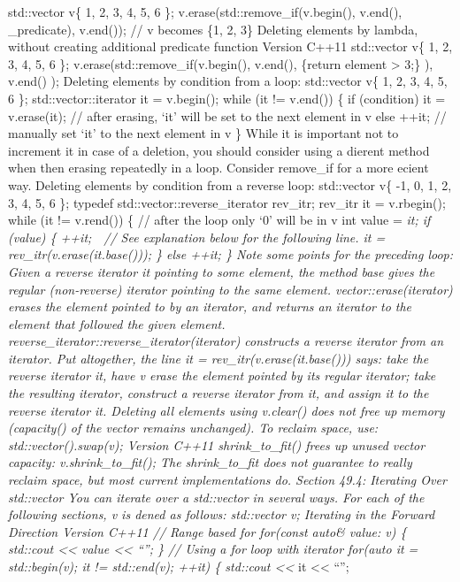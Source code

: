 std::vector v\{ 1, 2, 3, 4, 5, 6 \}; v.erase(std::remove\_if(v.begin(),
v.end(), \_predicate), v.end()); // v becomes \{1, 2, 3\} Deleting
elements by lambda, without creating additional predicate function
Version C++11 std::vector v\{ 1, 2, 3, 4, 5, 6 \};
v.erase(std::remove\_if(v.begin(), v.end(),
\href{auto\&\%20element}{}\{return element \textgreater{} 3;\} ),
v.end() ); Deleting elements by condition from a loop: std::vector v\{
1, 2, 3, 4, 5, 6 \}; std::vector::iterator it = v.begin(); while (it !=
v.end()) \{ if (condition) it = v.erase(it); // after erasing, `it' will
be set to the next element in v else ++it; // manually set `it' to the
next element in v \} While it is important not to increment it in case
of a deletion, you should consider using a dierent method when then
erasing repeatedly in a loop. Consider remove\_if for a more ecient way.
Deleting elements by condition from a reverse loop: std::vector v\{ -1,
0, 1, 2, 3, 4, 5, 6 \}; typedef std::vector::reverse\_iterator rev\_itr;
rev\_itr it = v.rbegin(); while (it != v.rend()) \{ // after the loop
only `0' will be in v int value = \emph{it; if (value) \{ ++it;  // See
explanation below for the following line. it =
rev\_itr(v.erase(it.base())); \} else ++it; \} Note some points for the
preceding loop: Given a reverse iterator it pointing to some element,
the method base gives the regular (non-reverse) iterator pointing to the
same element. vector::erase(iterator) erases the element pointed to by
an iterator, and returns an iterator to the element that followed the
given element. reverse\_iterator::reverse\_iterator(iterator) constructs
a reverse iterator from an iterator. Put altogether, the line it =
rev\_itr(v.erase(it.base())) says: take the reverse iterator it, have v
erase the element pointed by its regular iterator; take the resulting
iterator, construct a reverse iterator from it, and assign it to the
reverse iterator it. Deleting all elements using v.clear() does not free
up memory (capacity() of the vector remains unchanged). To reclaim
space, use: std::vector().swap(v); Version C++11 shrink\_to\_fit() frees
up unused vector capacity: v.shrink\_to\_fit(); The shrink\_to\_fit does
not guarantee to really reclaim space, but most current implementations
do. Section 49.4: Iterating Over std::vector You can iterate over a
std::vector in several ways. For each of the following sections, v is
dened as follows: std::vector v; Iterating in the Forward Direction
Version C++11 // Range based for for(const auto\& value: v) \{ std::cout
\textless\textless{} value \textless\textless{} ``\n''; \} // Using a
for loop with iterator for(auto it = std::begin(v); it != std::end(v);
++it) \{ std::cout \textless\textless{} }it \textless\textless{} ``\n'';
